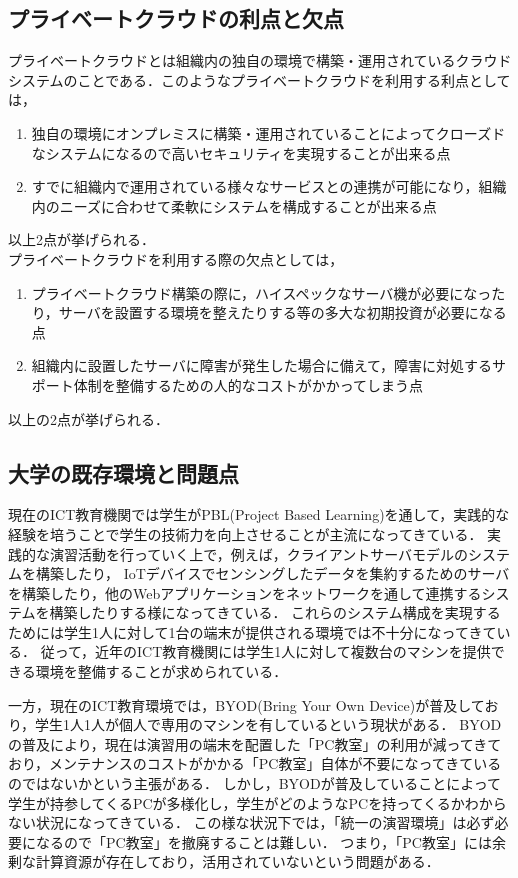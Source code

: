 \documentclass[11pt,a4paper]{jsarticle}
\begin{document}
\subsection{プライベートクラウドの利点と欠点}
プライベートクラウドとは組織内の独自の環境で構築・運用されているクラウドシステムのことである．このようなプライベートクラウドを利用する利点としては，
\begin{enumerate}
	\item 独自の環境にオンプレミスに構築・運用されていることによってクローズドなシステムになるので高いセキュリティを実現することが出来る点
	\item すでに組織内で運用されている様々なサービスとの連携が可能になり，組織内のニーズに合わせて柔軟にシステムを構成することが出来る点
\end{enumerate}
以上2点が挙げられる．\\
プライベートクラウドを利用する際の欠点としては，
\begin{enumerate}
	\item プライベートクラウド構築の際に，ハイスペックなサーバ機が必要になったり，サーバを設置する環境を整えたりする等の多大な初期投資が必要になる点
	\item 組織内に設置したサーバに障害が発生した場合に備えて，障害に対処するサポート体制を整備するための人的なコストがかかってしまう点
\end{enumerate}
以上の2点が挙げられる．

\subsection{大学の既存環境と問題点}
現在のICT教育機関では学生がPBL(Project Based Learning)を通して，実践的な経験を培うことで学生の技術力を向上させることが主流になってきている．
実践的な演習活動を行っていく上で，例えば，クライアントサーバモデルのシステムを構築したり，
IoTデバイスでセンシングしたデータを集約するためのサーバを構築したり，他のWebアプリケーションをネットワークを通して連携するシステムを構築したりする様になってきている．
これらのシステム構成を実現するためには学生1人に対して1台の端末が提供される環境では不十分になってきている．
従って，近年のICT教育機関には学生1人に対して複数台のマシンを提供できる環境を整備することが求められている．
\par 一方，現在のICT教育環境では，BYOD(Bring Your Own Device)が普及しており，学生1人1人が個人で専用のマシンを有しているという現状がある．
BYODの普及により，現在は演習用の端末を配置した「PC教室」の利用が減ってきており，メンテナンスのコストがかかる「PC教室」自体が不要になってきているのではないかという主張がある．
しかし，BYODが普及していることによって学生が持参してくるPCが多様化し，学生がどのようなPCを持ってくるかわからない状況になってきている．
この様な状況下では，「統一の演習環境」は必ず必要になるので「PC教室」を撤廃することは難しい．
つまり，「PC教室」には余剰な計算資源が存在しており，活用されていないという問題がある．
\end{document}
